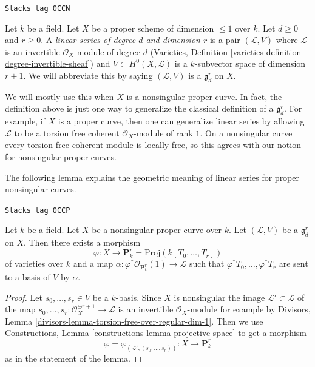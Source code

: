 \begin{definition}
\label{curves-definition-linear-series}
\href{https://stacks.math.columbia.edu/tag/0CCN}{\texttt{Stacks tag 0CCN}}

Let $k$ be a field. Let $X$ be a proper scheme of dimension $\leq 1$ over $k$.
Let $d \geq 0$ and $r \geq 0$.
A {\it linear series of degree $d$ and dimension $r$}
is a pair $(\mathcal{L}, V)$ where $\mathcal{L}$ is an
invertible $\mathcal{O}_X$-module of degree $d$
(Varieties, Definition \ref{varieties-definition-degree-invertible-sheaf})
and $V \subset H^0(X, \mathcal{L})$ is a $k$-subvector space
of dimension $r + 1$. We will abbreviate this by saying
$(\mathcal{L}, V)$ is a {\it $\mathfrak g^r_d$} on $X$.
\end{definition}

We will mostly use this when $X$ is a nonsingular proper curve.
In fact, the definition above is just one way to generalize the
classical definition of a $\mathfrak g^r_d$. For example, if $X$
is a proper curve, then one can generalize linear series by allowing
$\mathcal{L}$ to be a torsion free coherent $\mathcal{O}_X$-module
of rank $1$. On a nonsingular curve every torsion free
coherent module is locally free, so this agrees with our
notion for nonsingular proper curves.

\medskip\noindent
The following lemma explains the geometric meaning of linear series
for proper nonsingular curves.

\begin{lemma}
\label{curves-lemma-linear-series}
\href{https://stacks.math.columbia.edu/tag/0CCP}{\texttt{Stacks tag 0CCP}}

Let $k$ be a field. Let $X$ be a nonsingular proper curve over $k$.
Let $(\mathcal{L}, V)$ be a $\mathfrak g^r_d$ on $X$. Then
there exists a morphism
$$
\varphi : X \longrightarrow \mathbf{P}^r_k = \text{Proj}(k[T_0, \ldots, T_r])
$$
of varieties over $k$ and a map
$\alpha : \varphi^*\mathcal{O}_{\mathbf{P}^r_k}(1) \to \mathcal{L}$
such that $\varphi^*T_0, \ldots, \varphi^*T_r$
are sent to a basis of $V$ by $\alpha$.
\end{lemma}

\begin{proof}
Let $s_0, \ldots, s_r \in V$ be a $k$-basis. Since $X$ is nonsingular
the image $\mathcal{L}' \subset \mathcal{L}$ of the map
$s_0, \ldots, s_r : \mathcal{O}_X^{\oplus r + 1} \to \mathcal{L}$
is an invertible $\mathcal{O}_X$-module for example by
Divisors, Lemma \ref{divisors-lemma-torsion-free-over-regular-dim-1}.
Then we use
Constructions, Lemma \ref{constructions-lemma-projective-space}
to get a morphism
$$
\varphi = \varphi_{(\mathcal{L}', (s_0, \ldots, s_r))} :
X \longrightarrow \mathbf{P}^r_k
$$
as in the statement of the lemma.
\end{proof}

